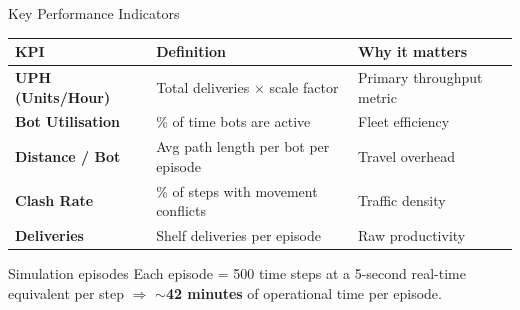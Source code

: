 \documentclass[aspectratio=169, 12pt]{beamer}
\begin{document}
\begin{frame}{Key Performance Indicators}
  \begin{center}
  \renewcommand{\arraystretch}{0.6}
  \begin{tabular}{>{\bfseries}p{4.5cm} p{4.5cm} p{4.5cm}}
    \toprule
    KPI & Definition & Why it matters \\
    \midrule
    \rowcolor{dhlRed!8}
    UPH (Units/Hour)    & Total deliveries $\times$ scale factor & Primary throughput metric \\
    Bot Utilisation     & \% of time bots are active             & Fleet efficiency \\
    \rowcolor{dhlRed!8}
    Distance / Bot      & Avg path length per bot per episode    & Travel overhead \\
    Clash Rate          & \% of steps with movement conflicts    & Traffic density \\
    \rowcolor{dhlRed!8}
    Deliveries          & Shelf deliveries per episode           & Raw productivity \\
    \bottomrule
  \end{tabular}
  \end{center}
  \vspace{0.5em}
  \begin{block}{Simulation episodes}
    Each episode = 500 time steps at a 5-second real-time equivalent per step
    $\Rightarrow$ $\sim$\textbf{42 minutes} of operational time per episode.
  \end{block}
\end{frame}
\end{document}
